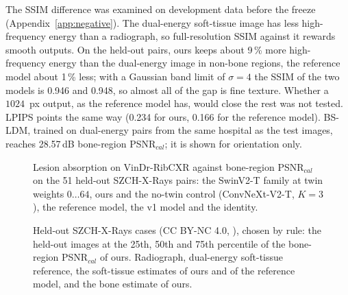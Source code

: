 The SSIM difference was examined on development data before the freeze (Appendix~\ref{app:negative}). The dual-energy soft-tissue image has
less high-frequency energy than a radiograph, so full-resolution SSIM against it rewards smooth outputs. On the held-out pairs, ours keeps
about 9\,\% more high-frequency energy than the dual-energy image in non-bone regions, the reference model about 1\,\% less; with a Gaussian
band limit of $\sigma=4$ the SSIM of the two models is 0.946 and 0.948, so almost all of the gap is fine texture. Whether a $1024$~px output,
as the reference model has, would close the rest was not tested. LPIPS points the same way (0.234 for ours, 0.166 for the reference model).
BS-LDM, trained on dual-energy pairs from the same hospital as the test images, reaches 28.57\,dB bone-region PSNR$_{cal}$; it is shown
for orientation only.
\begin{table}[htbp]
\centering\small
\caption{Held-out SZCH-X-Rays pairs: bone-region and whole-image metrics for ours and the comparators, calibrated (primary) and raw.}
\label{tab:szch_heldout}
\end{table}
\begin{table}[htbp]
\centering\small
\caption{H2$'$ non-inferiority on the 51 held-out SZCH-X-Rays pairs (paired differences, image bootstrap, one-sided 95\,\% lower bound).}
\label{tab:h2}
\end{table}
\begin{figure}[htbp]
\centering
{}
\caption{Lesion absorption on VinDr-RibCXR against bone-region PSNR$_{cal}$ on the 51 held-out SZCH-X-Rays pairs: the SwinV2-T family at
twin weights $0\ldots64$, ours and the no-twin control (ConvNeXt-V2-T, $K=3$), the reference model, the v1 model and the identity.}
\label{fig:pareto}
\end{figure}
\begin{figure}[htbp]
\centering
{}
\caption{Held-out SZCH-X-Rays cases (CC BY-NC 4.0, \citealp{sun2026bsldm}), chosen by rule: the held-out images at the 25th, 50th and 75th
percentile of the bone-region PSNR$_{cal}$ of ours. Radiograph, dual-energy soft-tissue reference, the soft-tissue estimates of ours and of the
reference model, and the bone estimate of ours.}
\label{fig:qualitative}
\end{figure}

